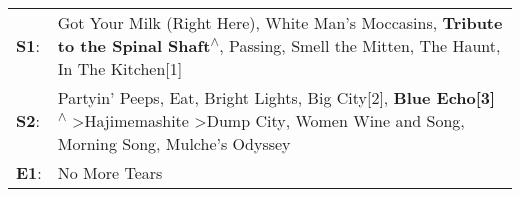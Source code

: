 \begin{supertabular}{p{0.03\textwidth}p{0.92\textwidth}}
 \textbf{S1}:  &                                                                                     Got Your Milk (Right Here)\textsuperscript{}, \enspace White Man's Moccasins\textsuperscript{}, \enspace \textbf{Tribute to the Spinal Shaft\textsuperscript{$\wedge$}}, \enspace Passing\textsuperscript{}, \enspace Smell the Mitten\textsuperscript{}, \enspace The Haunt\textsuperscript{}, \enspace In The Kitchen[1]\textsuperscript{}  \enspace  \\
 \textbf{S2}:  &  Partyin' Peeps\textsuperscript{}, \enspace Eat\textsuperscript{}, \enspace Bright Lights, Big City[2]\textsuperscript{}, \enspace \textbf{Blue Echo[3]\textsuperscript{$\wedge$}} \textgreater \enspace Hajimemashite\textsuperscript{} \textgreater \enspace Dump City\textsuperscript{}, \enspace Women Wine and Song\textsuperscript{}, \enspace Morning Song\textsuperscript{}, \enspace Mulche's Odyssey\textsuperscript{}  \enspace  \\
 \textbf{E1}:  &                                                                                                                                                                                                                                                                                                                                                                                                  No More Tears\textsuperscript{}  \enspace  \\
\end{supertabular}
